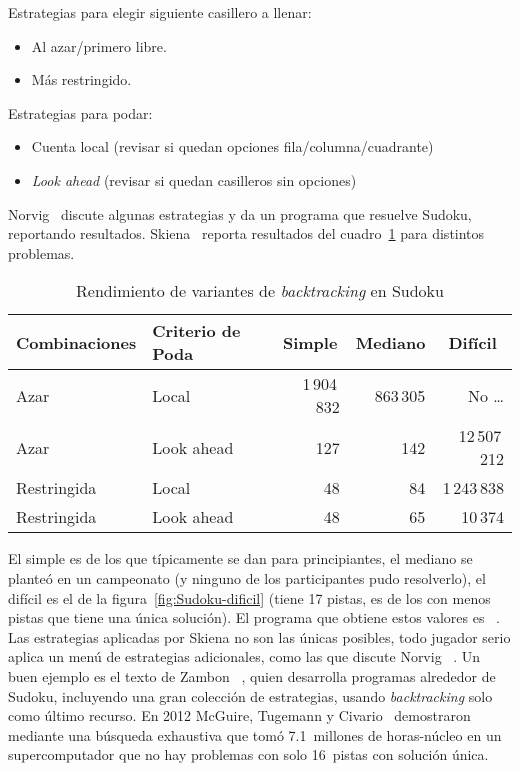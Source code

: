   Estrategias para elegir siguiente casillero a llenar:
  \begin{itemize}
  \item
    Al azar/primero libre.
  \item
    Más restringido.
  \end{itemize}
  Estrategias para podar:
  \begin{itemize}
  \item
    Cuenta local
    (revisar si quedan opciones fila/columna/cuadrante)
  \item
    \emph{\foreignlanguage{english}{Look ahead}}
    (revisar si quedan casilleros sin opciones)
  \end{itemize}
  Norvig~%
    \cite{norvig:_sudoku}
  discute algunas estrategias y da un programa que resuelve Sudoku,
  reportando resultados.
  Skiena~%
    \cite{skiena08:_algor_desig_manual}
  reporta resultados del cuadro~\ref{tab:backtracking-Sudoku}
  para distintos problemas.
  \begin{table}[ht]
    \centering
    \begin{tabular}{l|l|r|r|r}
      \multicolumn{1}{c|}{\textbf{Combinaciones}}
         & \textbf{Criterio de Poda}
         & \multicolumn{1}{c|}{\textbf{Simple}}
         & \multicolumn{1}{c|}{\textbf{Mediano}}
         & \multicolumn{1}{c}{\textbf{Difícil}} \\
      \hline
      Azar & Local & 1\,904\,832 & 863\,305 & No \ldots\\
      Azar & Look ahead & 127 & 142 & 12\,507\,212\\
      Restringida & Local & 48 & 84 & 1\,243\,838\\
      Restringida & Look ahead & 48 & 65 & 10\,374
    \end{tabular}
    \caption{Rendimiento de variantes
             de \emph{\foreignlanguage{english}{backtracking}} en Sudoku}
    \label{tab:backtracking-Sudoku}
  \end{table}
  El simple es de los que típicamente se dan para principiantes,
  el mediano se planteó en un campeonato
  (y ninguno de los participantes pudo resolverlo),
  el difícil es el de la figura~\ref{fig:Sudoku-dificil}
  (tiene 17 pistas,
   es de los con menos pistas que tiene una única solución).
  El programa que obtiene estos valores es~%
    \cite{skiena06:_backtr_progr_solve_sudoku}.
  Las estrategias aplicadas por Skiena no son las únicas posibles,
  todo jugador serio aplica un menú de estrategias adicionales,
  como las que discute Norvig~%
    \cite{norvig:_sudoku}.
  Un buen ejemplo es el texto de Zambon~%
    \cite{zambon15:_sudoku_programming_c},
  quien desarrolla programas alrededor de Sudoku,
  incluyendo una gran colección de estrategias,
  usando \emph{\foreignlanguage{english}{backtracking}}
  solo como último recurso.
  En 2012 McGuire, Tugemann y Civario~%
    \cite{mcguire12:_no_16-clue_sudoku}
  demostraron mediante una búsqueda exhaustiva
  que tomó \num{7,1}~millones de horas-núcleo en un supercomputador
  que no hay problemas con solo \num{16}~pistas con solución única.


